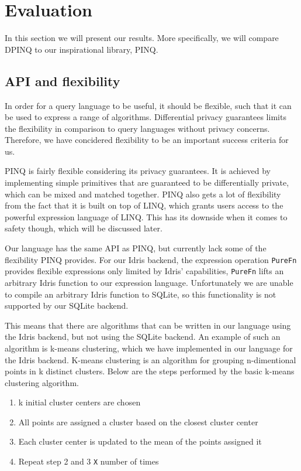 \documentclass[12pt]{article}
\begin{document}
\section{Evaluation}\label{sec:evaluation}

In this section we will present our results.
More specifically, we will compare DPINQ to our inspirational library, PINQ.

\subsection{API and flexibility}

In order for a query language to be useful, it should be flexible, such that it can be used to express a range of algorithms.
Differential privacy guarantees limits the flexibility in comparison to query languages without privacy concerns.
Therefore, we have concidered flexibility to be an important success criteria for us.

PINQ is fairly flexible considering its privacy guarantees.
It is achieved by implementing simple primitives that are guaranteed to be differentially private, which can be mixed and matched together.
PINQ also gets a lot of flexibility from the fact that it is built on top of LINQ, which grants users access to the powerful expression language of LINQ.
This has its downside when it comes to safety though, which will be discussed later.

Our language has the same API as PINQ, but currently lack some of the flexibility PINQ provides.
For our Idris backend, the expression operation \texttt{PureFn} provides flexible expressions only limited by Idris' capabilities,
\texttt{PureFn} lifts an arbitrary Idris function to our expression language.
Unfortunately we are unable to compile an arbitrary Idris function to SQLite, so this functionality is not supported by our SQLite backend.

This means that there are algorithms that can be written in our language using the Idris backend, but not using the SQLite backend.
An example of such an algorithm is k-means clustering, which we have implemented in our language for the Idris backend.
K-means clustering is an algorithm for grouping n-dimentional points in k distinct clusters.
Below are the steps performed by the basic k-means clustering algorithm.

\begin{enumerate}
	\item k initial cluster centers are chosen
	\item All points are assigned a cluster based on the closest cluster center 
	\item Each cluster center is updated to the mean of the points assigned it
	\item Repeat step 2 and 3 \texttt{X} number of times
\end{enumerate}
\end{document}
